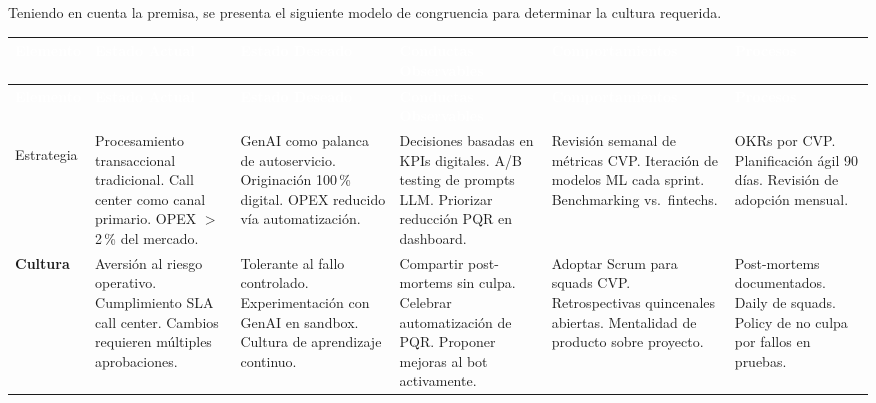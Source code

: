\documentclass[12pt,letterpaper]{article}
\begin{document}
Teniendo en cuenta la premisa, se presenta el siguiente modelo de congruencia para determinar
la cultura requerida.

\begingroup
\small
\setlength{\tabcolsep}{4pt}
\renewcommand{\arraystretch}{1.3}

\begin{longtable}{%
  >{\bfseries\RaggedRight}p{1.8cm}
  >{\RaggedRight}p{2.6cm}
  >{\RaggedRight}p{2.8cm}
  >{\RaggedRight}p{2.6cm}
  >{\RaggedRight}p{2.6cm}
  >{\RaggedRight}p{2.4cm}}

\rowcolor{headerblue}
\textcolor{white}{\textbf{Elemento}} &
\textcolor{white}{\textbf{Estado Actual}} &
\textcolor{white}{\textbf{Estado Deseado}} &
\textcolor{white}{\textbf{Conductas Observables}} &
\textcolor{white}{\textbf{Comportamientos}} &
\textcolor{white}{\textbf{Procesos}} \\
\endfirsthead

\rowcolor{headerblue}
\textcolor{white}{\textbf{Elemento}} &
\textcolor{white}{\textbf{Estado Actual}} &
\textcolor{white}{\textbf{Estado Deseado}} &
\textcolor{white}{\textbf{Conductas Observables}} &
\textcolor{white}{\textbf{Comportamientos}} &
\textcolor{white}{\textbf{Procesos}} \\
\endhead

\rowcolor{rowlightblue}
Estrategia &
Procesamiento transaccional tradicional. Call center como canal primario. OPEX $>$ 2\,\% del mercado. &
GenAI como palanca de autoservicio. Originación 100\,\% digital. OPEX reducido vía automatización. &
Decisiones basadas en KPIs digitales. A/B testing de prompts LLM. Priorizar reducción PQR en dashboard. &
Revisión semanal de métricas CVP. Iteración de modelos ML cada sprint. Benchmarking vs.\ fintechs. &
OKRs por CVP. Planificación ágil 90 días. Revisión de adopción mensual. \\

Cultura &
Aversión al riesgo operativo. Cumplimiento SLA call center. Cambios requieren múltiples aprobaciones. &
Tolerante al fallo controlado. Experimentación con GenAI en sandbox. Cultura de aprendizaje continuo. &
Compartir post-mortems sin culpa. Celebrar automatización de PQR. Proponer mejoras al bot activamente. &
Adoptar Scrum para squads CVP. Retrospectivas quincenales abiertas. Mentalidad de producto sobre proyecto. &
Post-mortems documentados. Daily de squads. Policy de no culpa por fallos en pruebas. \\


\end{longtable}
\end{document}
